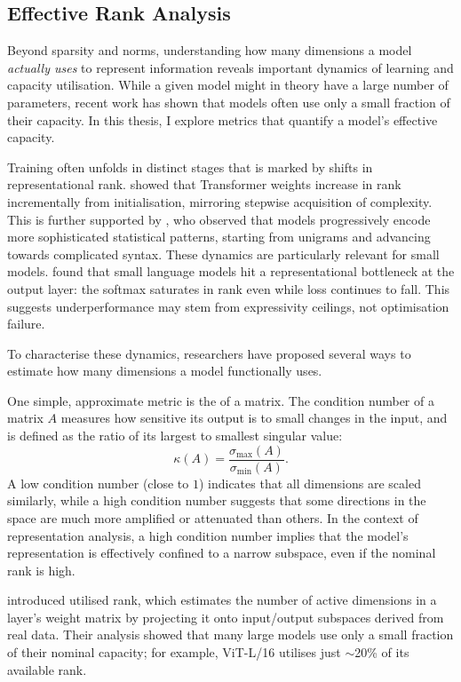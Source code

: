 \subsection{Effective Rank Analysis}

Beyond sparsity and norms, understanding how many dimensions a model \textit{actually uses} to represent information reveals important dynamics of learning and capacity utilisation. While a given model might in theory have a large number of parameters, recent work has shown that models often use only a small fraction of their capacity. In this thesis, I explore metrics that quantify a model's effective capacity.

Training often unfolds in distinct stages that is marked by shifts in representational rank. \citet{boix-adsera2023rank} showed that Transformer weights increase in rank incrementally from initialisation, mirroring stepwise acquisition of complexity. This is further supported by \citet{belrose2024neural}, who observed that models progressively encode more sophisticated statistical patterns, starting from unigrams and advancing towards complicated syntax. These dynamics are particularly relevant for small models. \citet{godey2024small} found that small language models hit a representational bottleneck at the output layer: the softmax saturates in rank even while loss continues to fall. This suggests underperformance may stem from expressivity ceilings, not optimisation failure.

To characterise these dynamics, researchers have proposed several ways to estimate how many dimensions a model functionally uses. 

One simple, approximate metric is the  of a matrix. The condition number of a matrix $A$ measures how sensitive its output is to small changes in the input, and is defined as the ratio of its largest to smallest singular value:
\[
\kappa(A) = \frac{\sigma_{\max}(A)}{\sigma_{\min}(A)}.
\]
A low condition number (close to $1$) indicates that all dimensions are scaled similarly, while a high condition number suggests that some directions in the space are much more amplified or attenuated than others. In the context of representation analysis, a high condition number implies that the model's representation is effectively confined to a narrow subspace, even if the nominal rank is high.

\citet{garg2025utilizedrank} introduced utilised rank, which estimates the number of active dimensions in a layer's weight matrix by projecting it onto input/output subspaces derived from real data. Their analysis showed that many large models use only a small fraction of their nominal capacity; for example, ViT-L/16 utilises just $\sim$20\% of its available rank.

